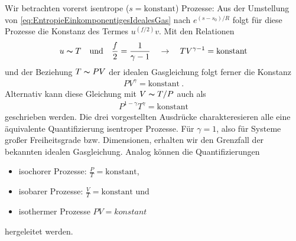 Wir betrachten vorerst isentrope ($s=\text{konstant}$) Prozesse:
Aus der Umstellung von \eqref{eq:EntropieEinkomponentigesIdealesGas} nach $e^{(s-s_0)/R}$ folgt für diese Prozesse die Konstanz des Termes $u^{(f/2)}v$.  Mit den Relationen 
\begin{align*}
    u \thicksim T \quad\text{und}\quad \frac{f}{2}=\frac{1}{\gamma -1}\quad\rightarrow\quad TV^{\gamma-1}=\text{konstant}
\end{align*}
und der Beziehung $T\thicksim PV$ der idealen Gasgleichung folgt ferner die Konstanz 
\begin{align*}
    \boxed{PV^{\gamma}=\text{konstant}}\:.
\end{align*}
Alternativ kann diese Gleichung mit $V\thicksim T/P$ auch als 
\begin{align*}
    P^{1-\gamma}T^\gamma=\text{konstant}
\end{align*}
geschrieben werden.
Die drei vorgestellten Ausdrücke charakteresieren alle eine äquivalente Quantifizierung isentroper Prozesse.
Für $\gamma = 1$, also für Systeme großer Freiheitsgrade bzw. Dimensionen, erhalten wir den Grenzfall der bekannten idealen Gasgleichung. 
Analog können die Quantifizierungen 
\begin{itemize}
    \item isochorer Prozesse: $\frac{P}{T}=\text{konstant}$,
    \item isobarer Prozesse: $\frac{V}{T}=\text{konstant}$ und
    \item isothermer Prozesse $PV=konstant$
\end{itemize}
hergeleitet werden.  

